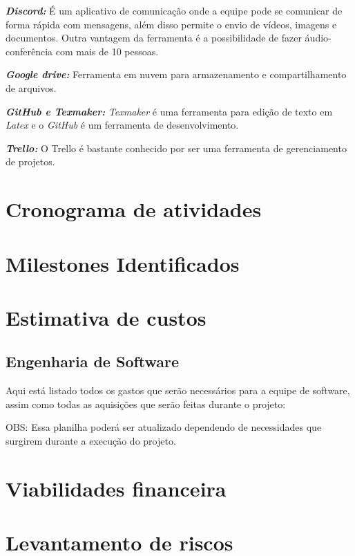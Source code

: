 \emph{\textbf{Discord:}} É um aplicativo de comunicação onde a equipe pode se comunicar de forma rápida com mensagens, além disso permite o envio de vídeos, imagens e documentos. Outra vantagem da ferramenta é a possibilidade de fazer áudio-conferência com mais de 10 pessoas.

\emph{\textbf{Google drive:}} Ferramenta em nuvem para armazenamento e compartilhamento de arquivos.

\emph{\textbf{GitHub e Texmaker:}} \emph{Texmaker} é uma ferramenta para edição de texto em \emph{Latex} e o \emph{GitHub} é um ferramenta de desenvolvimento.

\emph{\textbf{Trello:}} O Trello é bastante conhecido por ser uma ferramenta de gerenciamento de projetos. 

\section{Cronograma de atividades}
\section{Milestones Identificados}
\section{Estimativa de custos}

\subsection{Engenharia de Software}

Aqui está listado todos os gastos que serão necessários para a equipe de software, assim como todas as aquisições que serão feitas durante o projeto:

\begin{table}[h]
\end{table}

OBS: Essa planilha poderá ser atualizado dependendo de necessidades que surgirem durante a execução do projeto.

\section{Viabilidades financeira}
\section{Levantamento de riscos}
